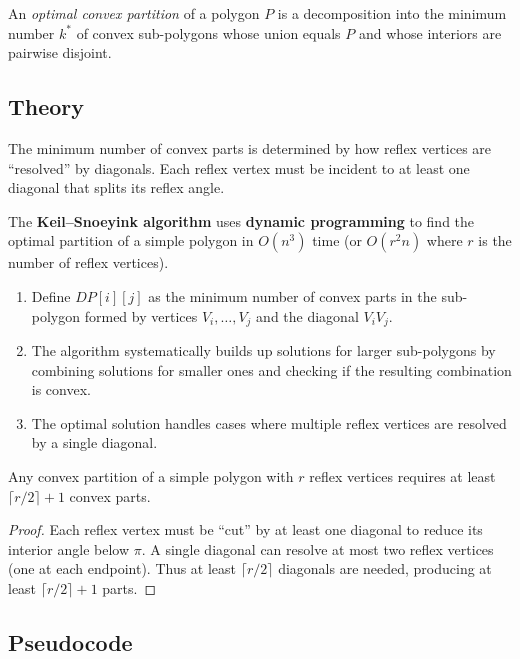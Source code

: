 \begin{definition}\label{def:optimal_partition}
An \emph{optimal convex partition} of a polygon $P$ is a decomposition into the minimum number $k^*$ of convex sub-polygons whose union equals $P$ and whose interiors are pairwise disjoint.
\end{definition}

\subsection{Theory}

The minimum number of convex parts is determined by how reflex vertices are ``resolved'' by diagonals. Each reflex vertex must be incident to at least one diagonal that splits its reflex angle.

The \textbf{Keil--Snoeyink algorithm} uses \textbf{dynamic programming} to find the optimal partition of a simple polygon in $O(n^3)$ time (or $O(r^2 n)$ where $r$ is the number of reflex vertices).
\begin{enumerate}
\item Define $DP[i][j]$ as the minimum number of convex parts in the sub-polygon formed by vertices $V_i, \dots, V_j$ and the diagonal $V_i V_j$.
\item The algorithm systematically builds up solutions for larger sub-polygons by combining solutions for smaller ones and checking if the resulting combination is convex.
\item The optimal solution handles cases where multiple reflex vertices are resolved by a single diagonal.
\end{enumerate}

\begin{theorem}\label{thm:convex_parts_lower}
Any convex partition of a simple polygon with $r$ reflex vertices requires at least $\lceil r/2 \rceil + 1$ convex parts.
\end{theorem}
\begin{proof}
Each reflex vertex must be ``cut'' by at least one diagonal to reduce its interior angle below $\pi$. A single diagonal can resolve at most two reflex vertices (one at each endpoint). Thus at least $\lceil r/2 \rceil$ diagonals are needed, producing at least $\lceil r/2 \rceil + 1$ parts.
\end{proof}

\subsection{Pseudocode}

